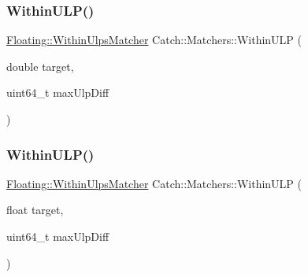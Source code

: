 \mbox{\label{namespace_catch_1_1_matchers_ae77e233c3ed735ea12b7c726153798d1}} 
\subsubsection{\texorpdfstring{Within\+U\+L\+P()}{WithinULP()}\hspace{0.1cm}{\footnotesize\ttfamily [1/2]}}
{\footnotesize\ttfamily \mbox{\hyperlink{struct_catch_1_1_matchers_1_1_floating_1_1_within_ulps_matcher}{Floating\+::\+Within\+Ulps\+Matcher}} Catch\+::\+Matchers\+::\+Within\+U\+LP (\begin{DoxyParamCaption}\item[{double}]{target,  }\item[{uint64\+\_\+t}]{max\+Ulp\+Diff }\end{DoxyParamCaption})}

\mbox{\label{namespace_catch_1_1_matchers_a5d108ff6aaeac40f20f4978dfb3f51fc}} 
\subsubsection{\texorpdfstring{Within\+U\+L\+P()}{WithinULP()}\hspace{0.1cm}{\footnotesize\ttfamily [2/2]}}
{\footnotesize\ttfamily \mbox{\hyperlink{struct_catch_1_1_matchers_1_1_floating_1_1_within_ulps_matcher}{Floating\+::\+Within\+Ulps\+Matcher}} Catch\+::\+Matchers\+::\+Within\+U\+LP (\begin{DoxyParamCaption}\item[{float}]{target,  }\item[{uint64\+\_\+t}]{max\+Ulp\+Diff }\end{DoxyParamCaption})}

